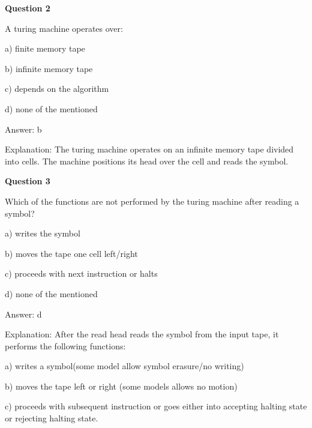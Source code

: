 \documentclass{article}
\begin{document}
\begin{mdframed}[linewidth=1pt, roundcorner=5pt, linecolor=gray!30, backgroundcolor=gray!5]
\textbf{Question 2} 

A turing machine operates over:

a) finite memory tape

b) infinite memory tape

c) depends on the algorithm

d) none of the mentioned
\vspace{5pt} \par
\begin{tcolorbox}[colback=green!5, colframe=green!40!black, title=Solution]
Answer: b

Explanation: The turing machine operates on an infinite memory tape divided into cells. The machine positions its head over the cell and reads the symbol.
\end{tcolorbox}
\end{mdframed}

\begin{mdframed}[linewidth=1pt, roundcorner=5pt, linecolor=gray!30, backgroundcolor=gray!5]
\textbf{Question 3} 

Which of the functions are not performed by the turing machine after reading a symbol?

a) writes the symbol

b) moves the tape one cell left/right

c) proceeds with next instruction or halts

d) none of the mentioned
\vspace{5pt} \par
\begin{tcolorbox}[colback=green!5, colframe=green!40!black, title=Solution]
Answer: d

Explanation: After the read head  reads the symbol from the input tape, it performs the following functions:

a) writes a symbol(some model allow symbol erasure/no writing)

b) moves the tape left or right (some models allows no motion)

c) proceeds with subsequent instruction or goes either into accepting halting state or rejecting halting state.
\end{tcolorbox}
\end{mdframed}
\newpage
\end{document}

